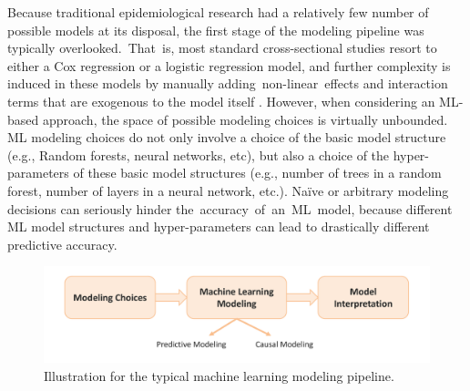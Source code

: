 \documentclass [PhD] {uclathes}
\begin{document}
Because traditional epidemiological research had a relatively few number of possible models at its disposal, the first stage of the modeling pipeline was typically overlooked.~That~is, most standard cross-sectional studies resort to either a Cox regression or a logistic regression model, and further complexity is induced in these models by manually adding~non-linear~effects and interaction terms that are exogenous to the model itself \cite{coutinho2008methods}. However, when considering an ML-based approach, the space of possible modeling choices is virtually unbounded. ML modeling choices do not only involve a choice of the basic model structure (e.g., Random forests, neural networks, etc), but also a choice of the hyper-parameters of these basic model structures (e.g., number of trees in a random forest, number of layers in a neural network, etc.). Na\"ive or arbitrary modeling decisions can seriously hinder the~accuracy~of~an~ML~model, because different ML model structures and hyper-parameters can lead to drastically different predictive accuracy.  

\begin{figure}[t]
\centering
\includegraphics[width=6.5in]{ch1Fig1.pdf}
\caption{Illustration for the typical machine learning modeling pipeline.}
\label{Fig1Ch1}
\end{figure} 
\end{document}
